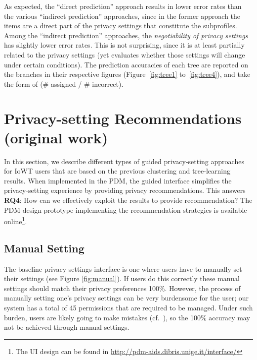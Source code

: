 As expected, the ``direct prediction'' approach results in lower error rates than the various ``indirect prediction'' approaches, since in the former approach the items are a direct part of the privacy settings that constitute the subprofiles. Among the ``indirect prediction'' approaches, the \textit{negotiability of privacy settings} has slightly lower error rates. This is not surprising, since it is at least partially related to the privacy settings (yet evaluates whether those settings will change under certain conditions). The prediction accuracies of each tree are reported on the branches in their respective figures (Figure~\ref{fig:tree1} to~\ref{fig:tree4}), and take the form of (\# assigned / \# incorrect). 

\section{Privacy-setting Recommendations (original work)}
In this section, we describe  different types of guided privacy-setting approaches for IoWT users that are based on the previous clustering and tree-learning results. When implemented in the PDM, the guided interface simplifies the privacy-setting experience by providing privacy recommendations. This answers \textbf{RQ4}: How can we effectively exploit the results to provide recommendation?  
The PDM design prototype implementing the recommendation strategies is available online\footnote{The UI design can be found in \url{http://pdm-aids.dibris.unige.it/interface/}}.
\subsection{Manual Setting}
\label{sec:manual}

The baseline privacy settings interface is one where users have to manually set their settings (see Figure \ref{fig:manual}). If users do this correctly these manual settings should match their privacy preferences 100\%. However, the process of manually setting one's privacy settings can be very burdensome for the user; our system has a total of 45 permissions that are required to be managed. Under such burden, users are likely going to make mistakes (cf.~\cite{madejski2012study}), so the 100\% accuracy may not be achieved through manual settings.

%	

